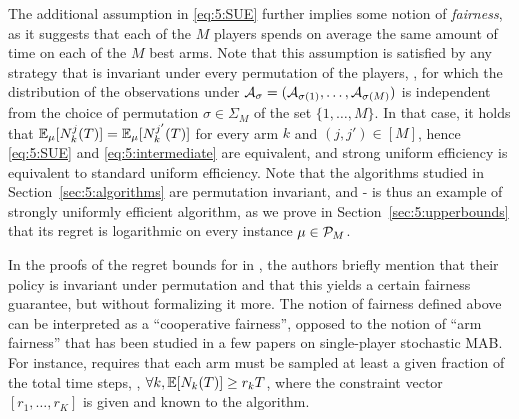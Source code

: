 The additional assumption in \eqref{eq:5:SUE} further implies some notion of \emph{fairness}, as it suggests that each of the $M$ players spends on average the same amount of time on each of the $M$ best arms. Note that this assumption is satisfied by any strategy that is invariant under every permutation of the players, \ie, for which the distribution of the observations under $\mathcal{A}_{\sigma} = (\mathcal{A}_{\sigma(1)},\dots,\mathcal{A}_{\sigma(M)})$ is independent from the choice of permutation $\sigma \in \Sigma_M$ of the set $\{1,\dots,M\}$.
In that case, it holds that  $\mathbb{E}_{\mu}[N_k^j(T)]=\mathbb{E}_{\mu}[N_k^{j'}(T)]$ for every arm $k$ and $(j,j') \in [M]$, hence \eqref{eq:5:SUE} and \eqref{eq:5:intermediate} are equivalent, and strong uniform efficiency is equivalent to standard uniform efficiency.
Note that the algorithms studied in Section~\ref{sec:5:algorithms} are permutation invariant, and \MCTopM-\klUCB{} is thus an example of strongly uniformly efficient algorithm, as we prove in Section~\ref{sec:5:upperbounds} that its regret is logarithmic on every instance $\mu \in \mathcal{P}_M$.

In the proofs of the regret bounds for \rhoRand{} in \cite{Anandkumar11}, the authors briefly mention that their policy is invariant under permutation and that this yields a certain fairness guarantee, but without formalizing it more.
The notion of fairness defined above can be interpreted as a ``cooperative fairness'', opposed to the notion of ``arm fairness'' that has been studied in a few papers on single-player stochastic MAB.
For instance, \cite{Patil2019stochastic} requires that each arm must be sampled at least a given fraction of the total time steps, \ie, $\forall k, \mathbb{E}[N_k(T)] \geq r_k T$, where the constraint vector $[r_1,\dots,r_K]$ is given and known to the algorithm.



